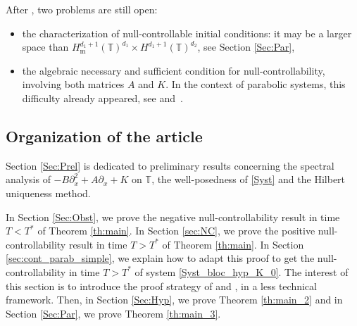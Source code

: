 \documentclass[10pt]{amsart}
\theoremstyle{plain}
\theoremstyle{definition}
\theoremstyle{remark}
\newcommand{\set}{\mathbb}
\newcommand{\T}{\set{T}}
\newcommand{\m}{{\mathrm m}}
\begin{document}
\pagebreak[2]
After , two problems are still open:
\begin{itemize}
\item the characterization of null-controllable initial conditions: it may be a larger space than $H^{d_1+1}_\m(\T)^{d_1} \times H^{d_1+1}(\T)^{d_2}$, see Section \ref{Sec:Par},
\item the algebraic necessary and sufficient condition for null-controllability, involving both matrices $A$ and $K$. In the context of parabolic systems, this difficulty already appeared, see \cite{ammarkhodja_2009} and~\cite{duprez_2016a}.
\end{itemize}

\subsection{Organization of the article}

Section \ref{Sec:Prel} is dedicated to preliminary results concerning the spectral analysis of $-B\partial_x^2+A\partial_x+K$ on $\T$, the well-posedness of \eqref{Syst} and the Hilbert uniqueness method.

In Section \ref{Sec:Obst}, we prove the negative null-controllability result in time $T<T^\ast$ of Theorem \ref{th:main}. In Section \ref{sec:NC}, we prove the positive null-controllability result in time $T>T^\ast$ of Theorem \ref{th:main}. In Section \ref{sec:cont_parab_simple}, we explain how to adapt this proof to get the null-controllability in time $T>T^\ast$ of system \eqref{Syst_bloc_hyp_K_0}. The interest of this section is to introduce the proof strategy of  and , in a less technical framework. Then, in Section \ref{Sec:Hyp}, we prove Theorem \ref{th:main_2} and in Section \ref{Sec:Par}, we prove Theorem \ref{th:main_3}.

\end{document}
